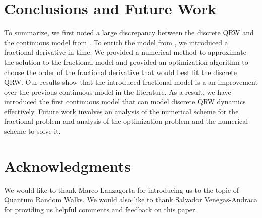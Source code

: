 \documentclass{siamart1116}
\begin{document}
\section{Conclusions and Future Work} \label{s:Conclusion}
To summarize, we first noted a large discrepancy between the discrete QRW and the continuous model from \cite{blanchard}. To enrich the model from \cite{blanchard}, we introduced a fractional derivative in time. We provided a numerical method to approximate the solution to the fractional model and provided an optimization algorithm to choose the order of the fractional derivative that would best fit the discrete QRW. Our results show that the introduced fractional model is a an improvement over the previous continuous model in the literature. As a result, we have introduced the first continuous model that can model discrete QRW dynamics effectively. Future work involves an analysis of the numerical scheme for the fractional problem and analysis of the optimization problem and the numerical scheme to solve it.

\section*{Acknowledgments}
We would like to thank Marco Lanzagorta for introducing us to the topic of Quantum Random Walks. We would also like to thank Salvador Venegas-Andraca for providing us helpful comments and feedback on this paper.


\appendix
\end{document}
